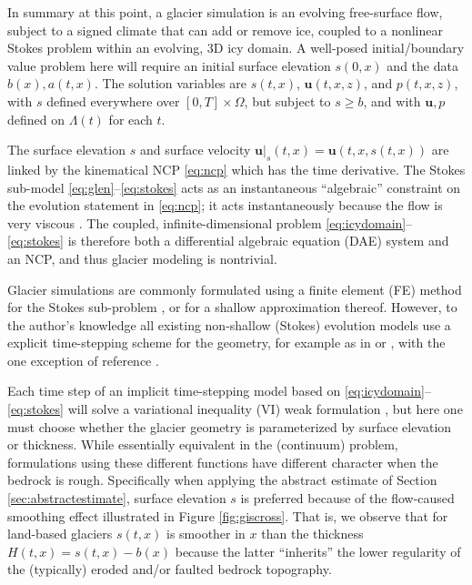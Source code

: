 \documentclass[hidelinks,onefignum,onetabnum,final]{siamart220329}  %
\newcommand{\bu}{\mathbf{u}}
\begin{document}
In summary at this point, a glacier simulation is an evolving free-surface flow, subject to a signed climate that can add or remove ice, coupled to a nonlinear Stokes problem within an evolving, 3D icy domain.  A well-posed initial/boundary value problem here will require an initial surface elevation $s(0,x)$ and the data $b(x),a(t,x)$.  The solution variables are $s(t,x)$, $\bu(t,x,z)$, and $p(t,x,z)$, with $s$ defined everywhere over $[0,T]\times \Omega$, but subject to $s \ge b$, and with $\bu,p$ defined on $\Lambda(t)$ for each $t$.

The surface elevation $s$ and surface velocity $\bu|_s(t,x)=\bu(t,x,s(t,x))$ are linked by the kinematical NCP \eqref{eq:ncp} which has the time derivative.  The Stokes sub-model \eqref{eq:glen}--\eqref{eq:stokes} acts as an instantaneous ``algebraic'' constraint on the evolution statement in \eqref{eq:ncp}; it acts instantaneously because the flow is very viscous \cite{Acheson1990}.  The coupled, infinite-dimensional problem \eqref{eq:icydomain}--\eqref{eq:stokes} is therefore both a differential algebraic equation (DAE) system \cite{AscherPetzold1998} and an NCP, and thus glacier modeling is nontrivial.

Glacier simulations are commonly formulated using a finite element (FE) method for the Stokes sub-problem \cite{IsaacStadlerGhattas2015,Jouvetetal2008,Pattynetal2008}, or for a shallow approximation thereof.  However, to the author's knowledge all existing non-shallow (Stokes) evolution models use a explicit time-stepping scheme for the geometry, for example as in \cite{Jouvetetal2008} or \cite{LofgrenAhlkronaHelanow2022}, with the one exception of reference \cite{WirbelJarosch2020}.

Each time step of an implicit time-stepping model based on \eqref{eq:icydomain}--\eqref{eq:stokes} will solve a variational inequality (VI) weak formulation \cite{Evans2010,KinderlehrerStampacchia1980}, but here one must choose whether the glacier geometry is parameterized by surface elevation or thickness.  While essentially equivalent in the (continuum) problem, formulations using these different functions have different character when the bedrock is rough.  Specifically when applying the abstract estimate of Section \ref{sec:abstractestimate}, surface elevation $s$ is preferred because of the flow-caused smoothing effect illustrated in Figure \ref{fig:giscross}.  That is, we observe that for land-based glaciers $s(t,x)$ is smoother in $x$ than the thickness $H(t,x) = s(t,x)-b(x)$ because the latter ``inherits'' the lower regularity of the (typically) eroded and/or faulted bedrock topography.
\end{document}
